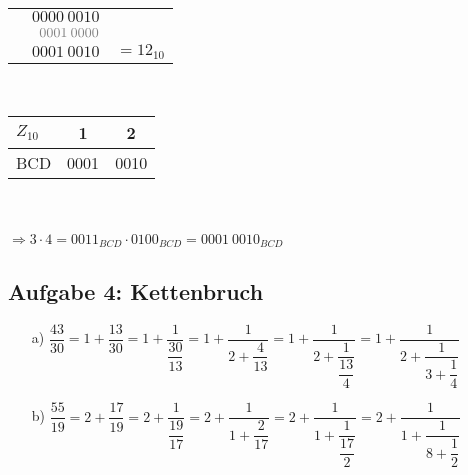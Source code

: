 \documentclass{article}
\begin{document}
\begin{enumerate}
\begin{minipage}[t]{0.4\textwidth}
\begin{tabular}{crl}
        		  &  $0000\:0010$ &   \\
        		  &  $\color{gray} 0001\:0000$ &   \\ \hline
        		  &  $0001\:0010$ &$=12_{10}$
        	\end{tabular}
        \end{minipage}
    	\begin{minipage}[t]{0.2\textwidth}
    		\hfill \\
    		\begin{tabular}{l|cc}
    			$Z_{10}$ &  1   &  2   \\ \hline
    			BCD      & 0001 & 0010
    		\end{tabular}
    	\end{minipage}\\\\
        $\Rightarrow 3\cdot 4=0011_{BCD}\cdot 0100_{BCD}=0001\:0010_{BCD}$
    \end{enumerate}


    \subsection*{Aufgabe 4: Kettenbruch}
    \begin{enumerate}
        \item[a)]$\dfrac{43}{30}=1+\dfrac{13}{30}=1+\dfrac{1}{\dfrac{30}{13}}=1+\dfrac{1}{2+\dfrac{4}{13}}=1+\dfrac{1}{2+\dfrac{1}{\dfrac{13}{4}}}=1+\dfrac{1}{2+\dfrac{1}{3+\dfrac{1}{4}}}$
        \item[b)]$\dfrac{55}{19}=2+\dfrac{17}{19}=2+\dfrac{1}{\dfrac{19}{17}}=2+\dfrac{1}{1+\dfrac{2}{17}}=2+\dfrac{1}{1+\dfrac{1}{\dfrac{17}{2}}}=2+\dfrac{1}{1+\dfrac{1}{8+\dfrac{1}{2}}}$
    \end{enumerate}
\end{document}
